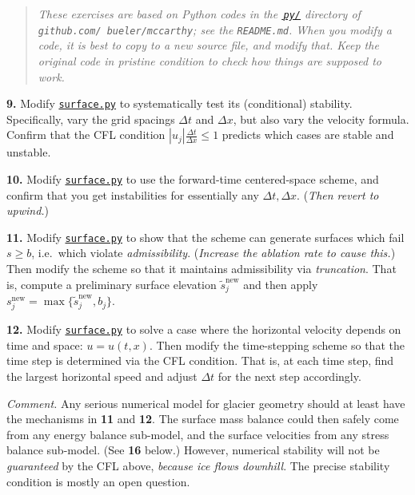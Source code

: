\documentclass[12pt]{amsart}
\newcommand{\prob}[1]{\medskip\noindent\textbf{#1.}\quad }
\begin{document}
\smallskip
\begin{quote}
\emph{These exercises are based on Python codes in the \href{https://github.com/bueler/mccarthy/tree/master/py}{\,\emph{\texttt{py/}}} directory of \emph{\texttt{github.com/ bueler/mccarthy}}; see the \emph{\texttt{README.md}}.  When you modify a code, it is best to copy to a new source file, and modify that.  Keep the original code in pristine condition to check how things are supposed to work.}
\end{quote}

\prob{9}  Modify \href{https://github.com/bueler/mccarthy/blob/master/py/surface.py}{\texttt{surface.py}} to systematically test its (conditional) stability.  Specifically, vary the grid spacings $\Delta t$ and $\Delta x$, but also vary the velocity formula.  Confirm that the CFL condition $|u_j| \frac{\Delta t}{\Delta x} \le 1$ predicts which cases are stable and unstable.

\prob{10}  Modify \href{https://github.com/bueler/mccarthy/blob/master/py/surface.py}{\texttt{surface.py}} to use the forward-time centered-space scheme, and confirm that you get instabilities for essentially any $\Delta t,\Delta x$.  (\emph{Then revert to upwind.})

\prob{11}  Modify \href{https://github.com/bueler/mccarthy/blob/master/py/surface.py}{\texttt{surface.py}} to show that the scheme can generate surfaces which fail $s\ge b$, i.e.~which violate \emph{admissibility}.  (\emph{Increase the ablation rate to cause this.})  Then modify the scheme so that it maintains admissibility via \emph{truncation}.  That is, compute a preliminary surface elevation ${\tilde s}_j^{\text{new}}$ and then apply $s_j^{\text{new}} = \max\{{\tilde s}_j^{\text{new}},b_j\}$.

\prob{12}  Modify \href{https://github.com/bueler/mccarthy/blob/master/py/surface.py}{\texttt{surface.py}} to solve a case where the horizontal velocity depends on time and space: $u=u(t,x)$.  Then modify the time-stepping scheme so that the time step is determined via the CFL condition.  That is, at each time step, find the largest horizontal speed and adjust $\Delta t$ for the next step accordingly.

\medskip

\smallskip
\noindent \emph{Comment.}  Any serious numerical model for glacier geometry should at least have the mechanisms in \textbf{11} and \textbf{12}.  The surface mass balance could then safely come from any energy balance sub-model, and the surface velocities from any stress balance sub-model.  (See \textbf{16} below.)  However, numerical stability will not be \emph{guaranteed} by the CFL above, \emph{because ice flows downhill}.  The precise stability condition is mostly an open question.
\end{document}
